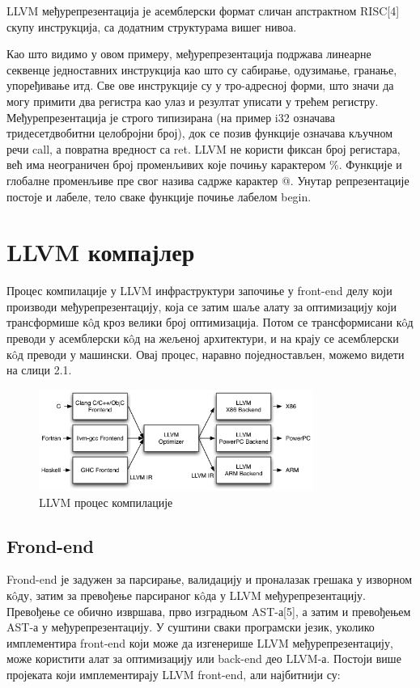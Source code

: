 \documentclass[12pt,oneside]{memoir}
\begin{document}
LLVM међурепрезентација је асемблерски формат сличан апстрактном RISC[4] скупу
инструкција, са додатним структурама вишег нивоа.

Као што видимо у овом примеру, међурепрезентација подржава линеарне секвенце
једноставних инструкција као што су сабирање, одузимање, гранање, упоређивање итд.
Све ове инструкције су у тро-адресној форми, што значи да могу примити два регистра 
као улаз и резултат уписати у трећем регистру.
Међурепрезентација је строго типизирана (на пример i32 означава тридесетдвобитни
целобројни број), док се позив функције означава кључном речи call, а повратна
вредност са ret.
LLVM не користи фиксан број регистара, већ има неограничен број променљивих које
почињу карактером \%. 
Функције и глобалне променљиве пре свог назива садрже карактер @.
Унутар репрезентације постоје и лабеле, тело сваке функције почиње лабелом begin.

\section{LLVM компајлер}  

Процес компилације у LLVM инфраструктури започиње у front-end делу који производи
међурепрезентацију, која се затим шаље алату за оптимизацију који трансформише
к\^{o}д кроз велики број оптимизација.
Потом се трансформисани к\^{o}д преводи у асемблерски к\^{o}д на жељеној архитектури, 
и на крају се асемблерски к\^{o}д преводи у машински. 
Овај процес, наравно поједностављен, можемо видети на слици 2.1. 

\begin{figure}[!ht]
  \centering
  \includegraphics[width=0.8\textwidth]{LLVMCompiler1.png}
  \caption{LLVM процес компилације}
  \label{fig:grafikon}
\end{figure}

\subsection{Frond-end}
 Frond-end је задужен за парсирање, валидацију и проналазак грешака у изворном
 к\^{o}ду, затим за превођење парсираног к\^{o}да у LLVM међурепрезентацију.
 Превођење се обично извршава, прво изградњом AST-а[5], а затим 
 и превођењем AST-а у међурепрезентацију.
 У суштини сваки програмски језик, уколико имплементира front-end који може да
 изгенерише LLVM међурепрезентацију, може користити алат за оптимизацију или 
 back-end део LLVM-а.
 Постоји више пројеката који имплементирају LLVM front-end, али најбитнији су:
 
\end{document}
